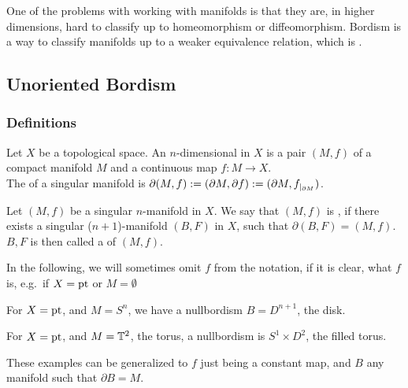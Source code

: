\documentclass[a4paper,11pt]{article}
\begin{document}
One of the problems with working with manifolds is that they are, in higher dimensions, hard to classify up to homeomorphism or diffeomorphism. Bordism is a way to classify manifolds up to a weaker equivalence relation, which is . 

\subsection{Unoriented Bordism}
\subsubsection{Definitions}

\begin{definition}\label{singular manifold}
    Let \(X\) be a topological space. An \(n\)-dimensional  in \(X\) is a pair \((M,f)\) of a compact manifold \(M\) and a continuous map \(f:M\to X\).\\
    The  of a singular manifold is \(\partial(M,f):=(\partial M, \partial f):=(\partial M,f_{|_{\partial M}})\).
\end{definition}

\begin{definition}
    Let \((M,f)\) be a singular \(n\)-manifold in \(X\). We say that \((M,f)\) is , if there exists a singular (\(n+1\))-manifold \((B,F)\) in \(X\), such that \(\partial(B,F)=(M,f)\).\\
    \(B,F\) is then called a  of \((M,f)\).
\end{definition}

In the following, we will sometimes omit \(f\) from the notation, if it is clear, what \(f\) is, e.g.\ if \(X=\mathrm{pt}\) or \(M=\emptyset\)

\begin{example}
    For \(X=\mathrm{pt}\), and \(M=S^n\), we have a nullbordism \(B=D^{n+1}\), the disk.%
\end{example}

\begin{example}
    For \(X=\mathrm{pt}\), and \(M=\mathbb{T}^2\), the torus, a nullbordism is \(S^1\times D^2\), the filled torus.
\end{example}

\begin{remark}
    These examples can be generalized to \(f\) just being a constant %
    map, and \(B\) any manifold such that \(\partial B=M\). 
\end{remark}
\end{document}
